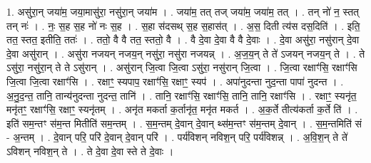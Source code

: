 \documentclass[17pt]{extarticle}
\begin{document}
1. असु॑रा॒न् जया॑म॒ जया॒मासु॑रा॒ नसु॑रा॒न् जया॑म । . जया॑म॒ तत् तज् जया॑म॒ जया॑म॒ तत् । . तन् नो॑ न॒ स्तत् तन् नः॑ । . नः॒ स॒ह स॒ह नो॑ नः स॒ह । . स॒हा स॑दसथ् स॒ह स॒हास॑त् । . अ॒स॒ दिती त्य॑स दस॒दिति॑ । . इति॒ तत॒ स्तत॒ इतीति॒ ततः॑ । . ततो॒ वै वै तत॒ स्ततो॒ वै । . वै दे॒वा दे॒वा वै वै दे॒वाः । . दे॒वा असु॑रा॒ नसु॑रान् दे॒वा दे॒वा असु॑रान् । . असु॑रा नजयन् नजय॒न् नसु॑रा॒ नसु॑रा नजयन्न् । . अ॒ज॒य॒न् ते ते॑ ऽजयन् नजय॒न् ते । . ते ऽसु॑रा॒ नसु॑रा॒न् ते ते ऽसु॑रान् । . असु॑रान् जि॒त्वा जि॒त्वा ऽसु॑रा॒ नसु॑रान् जि॒त्वा । . जि॒त्वा रक्षाꣳ॑सि॒ रक्षाꣳ॑सि जि॒त्वा जि॒त्वा रक्षाꣳ॑सि । . रक्षाꣳ॒॒ स्यपाप॒ रक्षाꣳ॑सि॒ रक्षाꣳ॒॒ स्यप॑ । . अपा॑नुदन्ता नुद॒न्ता पापा॑ नुदन्त । . अ॒नु॒द॒न्त॒ तानि॒ तान्य॑नुदन्ता नुदन्त॒ तानि॑ । . तानि॒ रक्षाꣳ॑सि॒ रक्षाꣳ॑सि॒ तानि॒ तानि॒ रक्षाꣳ॑सि । . रक्षाꣳ॒॒ स्यनृ॑त॒ मनृ॑तꣳ॒॒ रक्षाꣳ॑सि॒ रक्षाꣳ॒॒ स्यनृ॑तम् । . अनृ॑त मकर्ता क॒र्तानृ॑त॒ मनृ॑त मकर्त । . अ॒क॒र्ते तीत्य॑कर्ता क॒र्ते ति॑ । . इति॑ सम॒न्तꣳ स॑म॒न्त मितीति॑ सम॒न्तम् । . स॒म॒न्तम् दे॒वान् दे॒वान् थ्स॑म॒न्तꣳ स॑म॒न्तम् दे॒वान् । . स॒म॒न्तमिति॑ सं - अ॒न्तम् । . दे॒वान् परि॒ परि॑ दे॒वान् दे॒वान् परि॑ । . पर्य॑विशन् नविश॒न् परि॒ पर्य॑विशन्न् । . अ॒वि॒श॒न् ते ते॑ ऽविशन् नविश॒न् ते । . ते दे॒वा दे॒वा स्ते ते दे॒वाः । \newline
\end{document}
